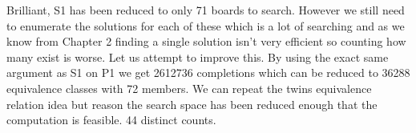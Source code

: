 \documentclass[a4paper,11pt]{report}
\newcounter{row}
\newcounter{col}
\newcounter{rowb}
\newcounter{colb}
\newcommand\setrowb[3]{
  \setcounter{colb}{1}
  \foreach \n in {#1, #2, #3} {
    \edef\x{\value{colb} - 0.5}
    \edef\y{3.5 - \value{rowb}}
    \node[anchor=center] at (\x, \y) {\n};
    \stepcounter{colb}
  }
  \stepcounter{rowb}
}
\begin{document}
{\begin{figure}[h!]
\centering
{}
\caption{\label{fig:twins}}
\end{figure}

\begin{figure}[h!]
\centering
{}
\caption{\label{fig:twins}}
\end{figure}

Brilliant, S1 has been reduced to only 71 boards to search. However we still need to enumerate the solutions for each of these which is a lot of searching and as we know from Chapter 2 finding a single solution isn't very efficient so counting how many exist is worse. Let us attempt to improve this. By using the exact same argument as S1 on P1 we get 2612736 completions which can be reduced to 36288 equivalence classes with 72 members. We can repeat the twins equivalence relation idea but \cite{} reason the search space has been reduced enough that the computation is feasible. 44 distinct counts.

}
\end{document}
